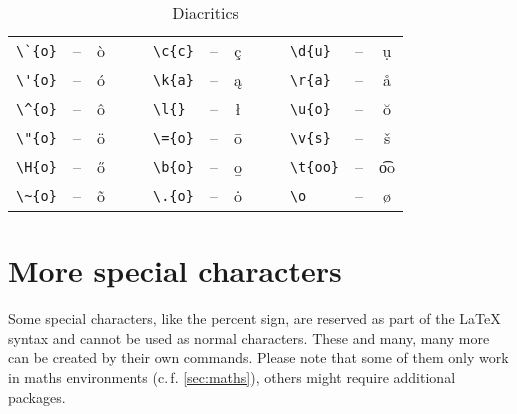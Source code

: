 \begin{table}[H]
	\center
	\begin{tabular}{lccclccclcc}
		\toprule
			\verb|\`{o}| & -- & \`{o} & $\quad$ & \verb|\c{c}| & -- & \c{c} & $\quad$ & \verb|\d{u}| & -- & \d{u} \\
			\verb|\'{o}| & -- & \'{o} & & \verb|\k{a}| & -- & \k{a} & & \verb|\r{a}| & -- & \r{a} \\
			\verb|\^{o}| & -- & \^{o} & & \verb|\l{}| & -- & \l{} & & \verb|\u{o}| & -- & \u{o} \\
			\verb|\"{o}| & -- & \"{o} & & \verb|\={o}| & -- & \={o} & & \verb|\v{s}| & -- & \v{s} \\
			\verb|\H{o}| & -- & \H{o} & & \verb|\b{o}| & -- & \b{o} & & \verb|\t{oo}| & -- & \t{oo} \\
			\verb|\~{o}| & -- & \~{o} & & \verb|\.{o}| & -- & \.{o} & & \verb|\o| & -- & \o \\
		\bottomrule
	\end{tabular}
	\caption{Diacritics}
	\label{tbl:diacritics}
\end{table}

\section{More special characters}
Some special characters, like the percent sign, are reserved as part of the \LaTeX{} syntax and cannot be used as normal characters.
These and many, many more can be created by their own commands.
Please note that some of them only work in maths environments (c.\,f. \cref{sec:maths}), others might require additional packages.

